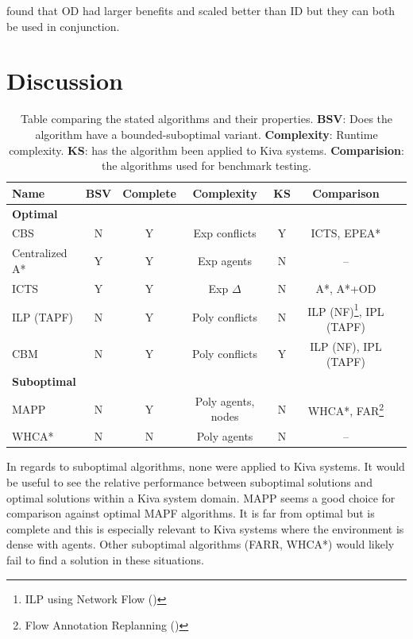 \documentclass[a4paper,11pt]{article}
\begin{document}
\cite{standley2010finding} found that OD had larger benefits and scaled better than ID but they can both be used in conjunction.

\newpage

\section{Discussion} \label{sec:discussion}

\begin{table}[ht]
	\centering
	\small
	\begin{tabular}{ l c c c c c p{2.3cm}}
		
		\textbf{Name} & \textbf{BSV} & \textbf{Complete} & \textbf{Complexity} & \textbf{KS} & \textbf{Comparison} \\
		\hline
		\multicolumn{6}{l}{\textbf{Optimal}} \\
		\hline
		CBS 				& N & Y & Exp conflicts & Y & ICTS, EPEA* \\
		Centralized A* 		& Y & Y & Exp agents & N & -- \\
		ICTS 				& Y & Y & Exp $\Delta$ & N & A*, A*+OD \\
		ILP	(TAPF)			& N & Y & Poly conflicts & N & ILP (NF)\footnote{ILP using Network Flow (\cite{yu2013multi})}, IPL (TAPF) \\
		CBM 				& N & Y & Poly conflicts & Y & ILP (NF), IPL (TAPF) \\
		\hline
		\multicolumn{6}{l}{\textbf{Suboptimal}} \\
		\hline
		MAPP 				& N & Y & Poly agents, nodes & N & WHCA*, FAR\footnote{Flow Annotation Replanning (\cite{wang2008fast})} \\
		WHCA* 				& N & N & Poly agents & N & -- \\
	\end{tabular}

	\caption{Table comparing the stated algorithms and their properties. \textbf{BSV}: Does the algorithm have a bounded-suboptimal variant. \textbf{Complexity}: Runtime complexity. \textbf{KS}: has the algorithm been applied to Kiva systems. \textbf{Comparision}: the algorithms used for benchmark testing.}
	\label{table:comparison}
\end{table}

In regards to suboptimal algorithms, none were applied to Kiva systems. It would be useful to see the relative performance between suboptimal solutions and optimal solutions within a Kiva system domain. MAPP seems a good choice for comparison against optimal MAPF algorithms. It is far from optimal but is complete and this is especially relevant to Kiva systems where the environment is dense with agents. Other suboptimal algorithms (FARR, WHCA*) would likely fail to find a solution in these situations.
\end{document}
